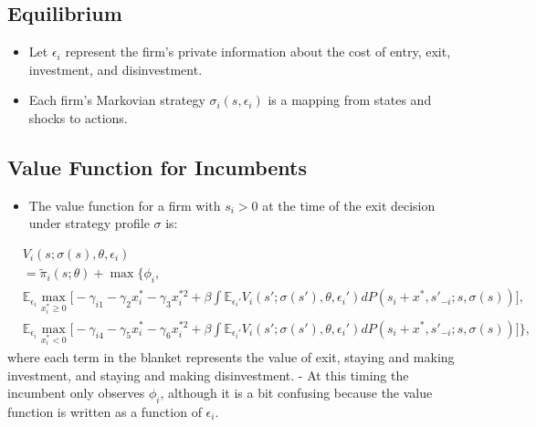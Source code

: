 \documentclass[
]{book}
\providecommand{\tightlist}{%
  \setlength{\itemsep}{0pt}\setlength{\parskip}{0pt}}
\begin{document}
\hypertarget{equilibrium}{%
\subsection{Equilibrium}\label{equilibrium}}

\begin{itemize}
\tightlist
\item
  Let \(\epsilon_i\) represent the firm's private information about the
  cost of entry, exit, investment, and disinvestment.
\item
  Each firm's Markovian strategy \(\sigma_i(s, \epsilon_i)\) is a
  mapping from states and shocks to actions.
\end{itemize}

\hypertarget{value-function-for-incumbents}{%
\subsection{Value Function for Incumbents}\label{value-function-for-incumbents}}

\begin{itemize}
\tightlist
\item
  The value function for a firm with \(s_i > 0\) at the time of the exit
  decision under strategy profile \(\sigma\) is:
\end{itemize}

\begin{equation}
\begin{split}
&V_i(s; \sigma(s), \theta, \epsilon_i)\\
&=\tilde{\pi}_i(s; \theta) + \max\Bigg\{\phi_i,\\
& \mathbb{E}_{\epsilon_i} \max_{x_i^* \ge 0}  \Bigg[ - \gamma_{i1} - \gamma_{2} x_i^* - \gamma_3 x_i^{*2} + \beta \int \mathbb{E}_{\epsilon_i'} V_i(s'; \sigma(s'), \theta, \epsilon_i') dP(s_i + x^*, s'_{-i}; s, \sigma(s))\Bigg],\\
&\mathbb{E}_{\epsilon_i} \max_{x_i^* < 0} \Bigg[- \gamma_{i4} - \gamma_5 x_i^* - \gamma_6 x_i^{*2} + \beta \int \mathbb{E}_{\epsilon_i'} V_i(s'; \sigma(s'), \theta, \epsilon_i') dP(s_i + x^*, s'_{-i}; s, \sigma(s))  \Bigg]\Bigg\},
\end{split}
\end{equation} where each term in the blanket represents the value of
exit, staying and making investment, and staying and making
disinvestment.
- At this timing the incumbent only observes \(\phi_i\),
although it is a bit confusing because the value function is written as
a function of \(\epsilon_i\).
\end{document}
